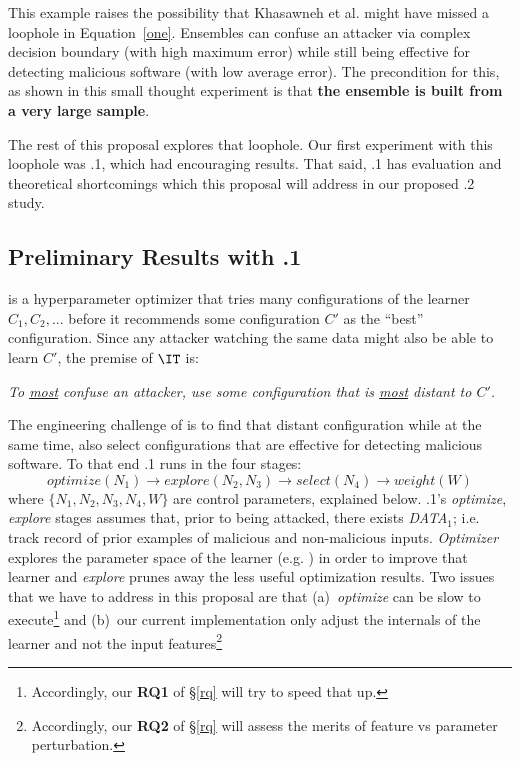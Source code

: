  
This example raises the possibility that  
 Khasawneh et al.  might have missed a loophole in Equation~\ref{one}. Ensembles can confuse an attacker via   complex decision boundary (with high maximum error) while still being effective
 for detecting malicious software   (with low average error). The precondition for this, as shown in this small thought experiment is that {\bf the ensemble is built from a very large sample}.
 
 The rest of this proposal explores that loophole. Our first experiment with this loophole
 was {\IT}.1, which had encouraging results.
 That said, {\IT}.1 has  evaluation and theoretical shortcomings
 which this proposal will address in our proposed {\IT}.2 study.
 

 
 
\subsection{Preliminary Results with {\IT}.1}
 


{\IT} is a hyperparameter optimizer that tries many  
configurations of the learner $C_1,C_2,...$  before it recommends some configuration $C'$ as the ``best'' configuration. 
Since any attacker watching the same data might also be able to learn $C'$, the premise of ${\IT}$ is:
\begin{center}
{\em To \underline{most} confuse an attacker, use some configuration that is  \underline{most} distant to $C'$.}
\end{center}
The engineering challenge of {\IT} is to find that   distant
configuration while at the same time, also select configurations that are effective for detecting malicious software. To that end
{\IT}.1 runs in the four stages:
\[\mathit{optimize}(N_1) \rightarrow \mathit{explore}(N_2,N_3) \rightarrow \mathit{select}(N_4) \rightarrow \mathit{weight}(W)
\]
where    $\{N_1,N_2,N_3,N_4,W\}$   are control parameters, explained below.
{\IT}.1's {\em optimize}, {\em explore}
stages assumes that, prior to being attacked,
there exists {\em DATA$_1$}; i.e. track record 
of prior examples of malicious and non-malicious inputs. 
{\em Optimizer} explores the parameter space of the learner (e.g. ) in order to improve that learner and {\em explore}
prunes away the less useful optimization results. Two issues that we have to address in this proposal are that
(a)~{\em optimize} can be slow to execute\footnote{Accordingly, our   {\bf RQ1} of \S\ref{rq} will try to speed that up.} and 
(b)~our current implementation
 only adjust the internals of the learner and not the input features\footnote{Accordingly, our   {\bf RQ2}  of \S\ref{rq} will assess the merits
 of feature vs parameter perturbation.}

